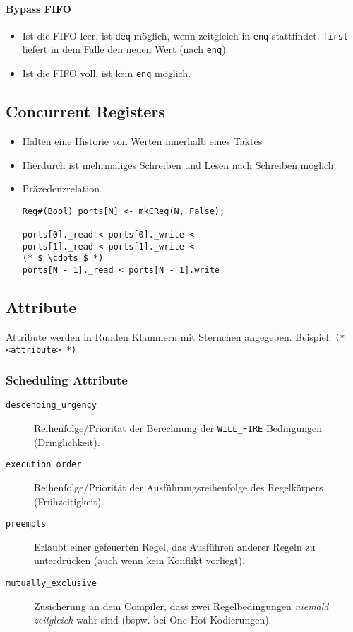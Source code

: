 \documentclass[a4paper, 11pt, accentcolor = tud3b]{tudreport}
\begin{document}
				\paragraph{Bypass FIFO}
					\begin{itemize}
						\item Ist die FIFO leer, ist \texttt{deq} möglich, wenn zeitgleich in \texttt{enq} stattfindet. \texttt{first} liefert in dem Falle den neuen Wert (nach \texttt{enq}).
						\item Ist die FIFO voll, ist kein \texttt{enq} möglich.
					\end{itemize}
			
			\subsection{Concurrent Registers}
				\begin{itemize}
					\item Halten eine Historie von Werten innerhalb eines Taktes
					\item Hierdurch ist mehrmaliges Schreiben und Lesen nach Schreiben möglich.
					\item Präzedenzrelation
						\begin{lstlisting}
Reg#(Bool) ports[N] <- mkCReg(N, False);

ports[0]._read < ports[0]._write <
ports[1]._read < ports[1]._write <
(* $ \cdots $ *)
ports[N - 1]._read < ports[N - 1].write
						\end{lstlisting}
				\end{itemize}
			
			\subsection{Attribute}
				Attribute werden in Runden Klammern mit Sternchen angegeben. Beispiel: \texttt{(* <attribute> *)}
				
				\subsubsection{Scheduling Attribute}
					\begin{description}
						\item[\texttt{descending\_urgency}] Reihenfolge/Priorität der Berechnung der \texttt{WILL\_FIRE} Bedingungen (Dringlichkeit).
						\item[\texttt{execution\_order}] Reihenfolge/Priorität der Ausführungsreihenfolge des Regelkörpers (Frühzeitigkeit).
						\item[\texttt{preempts}] Erlaubt einer gefeuerten Regel, das Ausführen anderer Regeln zu unterdrücken (auch wenn kein Konflikt vorliegt).
						\item[\texttt{mutually\_exclusive}] Zusicherung an dem Compiler, dass zwei Regelbedingungen \textit{niemald zeitgleich} wahr sind (bspw. bei One-Hot-Kodierungen).
					\end{description}
				
\end{document}
